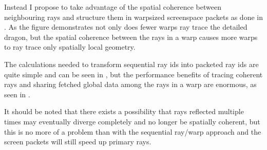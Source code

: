 Instead I propose to take advantage of the spatial coherence between
neighbouring rays and structure them in warpsized screenspace packets as done in
. As the figure demonstrates not only does fewer
warps ray trace the detailed dragon, but the spatial coherence between the rays
in a warp causes more warps to ray trace only spatially local geometry.

\begin{figure}
  \hspace{20pt}
  \caption[Sequantial and spatially coherent rays per warp.]{}
\end{figure}

The calculations needed to transform sequential ray ids into packeted ray ids
are quite simple and can be seen in , but the performance
benefits of tracing coherent rays and sharing fetched global data among the rays
in a warp are enormous, as seen in .

It should be noted that there exists a possibility that rays reflected multiple
times may eventually diverge completely and no longer be spatially coherent, but
this is no more of a problem than with the sequential ray/warp approach and the
screen packets will still speed up primary rays.

